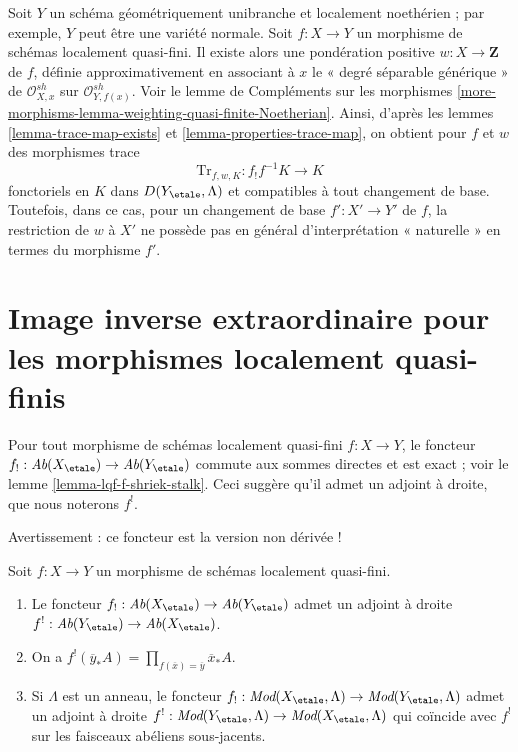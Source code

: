 \begin{example}
\label{example-trace-for-quasi-finite-over-normal}
Soit $Y$ un schéma géométriquement unibranche et localement noethérien ;
par exemple, $Y$ peut être une variété normale. Soit $f : X \to Y$ un morphisme de schémas
localement quasi-fini. Il existe alors une
pondération positive $w : X \to \mathbf{Z}$ de $f$,
définie approximativement en associant à $x$ le
« degré séparable générique »
de $\mathcal{O}_{X, x}^{sh}$ sur $\mathcal{O}_{Y, f(x)}^{sh}$.
Voir le lemme de Compléments sur les morphismes
\ref{more-morphisms-lemma-weighting-quasi-finite-Noetherian}.
Ainsi, d'après les lemmes \ref{lemma-trace-map-exists} et
\ref{lemma-properties-trace-map}, on obtient pour $f$ et $w$ des morphismes trace
$$
\text{Tr}_{f, w, K} : f_!f^{-1}K \longrightarrow K
$$
fonctoriels en $K$ dans $D(Y_\etale, \Lambda)$ et compatibles
à tout changement de base. Toutefois, dans ce cas, pour un changement de base
$f' : X' \to Y'$ de $f$, la restriction de $w$ à $X'$ ne possède pas en général
d'interprétation « naturelle » en termes du
morphisme $f'$.
\end{example}
















\section{Image inverse extraordinaire pour les morphismes localement quasi-finis}
\label{section-duality-locally-quasi-finite}

\noindent
Pour tout morphisme de schémas localement quasi-fini $f : X \to Y$, le
foncteur $f_! : \textit{Ab}(X_\etale) \to \textit{Ab}(Y_\etale)$ commute
aux sommes directes et est exact ; voir le lemme \ref{lemma-lqf-f-shriek-stalk}.
Ceci suggère qu'il admet un adjoint à droite, que nous noterons $f^!$.

\medskip\noindent
Avertissement : ce foncteur est la version non dérivée !

\begin{lemma}
\label{lemma-lqf-f-upper-shriek}
Soit $f : X \to Y$ un morphisme de schémas localement quasi-fini.
\begin{enumerate}
\item Le foncteur $f_! : \textit{Ab}(X_\etale) \to \textit{Ab}(Y_\etale)$
admet un adjoint à droite $f^! : \textit{Ab}(Y_\etale) \to \textit{Ab}(X_\etale)$.
\item On a
$f^!(\overline{y}_*A) = \prod_{f(\overline{x}) = \overline{y}} \overline{x}_*A$.
\item Si $\Lambda$ est un anneau, le foncteur
$f_! : \textit{Mod}(X_\etale, \Lambda) \to \textit{Mod}(Y_\etale, \Lambda)$
admet un adjoint à droite
$f^! : \textit{Mod}(Y_\etale, \Lambda) \to \textit{Mod}(X_\etale, \Lambda)$
qui coïncide avec $f^!$ sur les faisceaux abéliens sous-jacents.
\end{enumerate}
\end{lemma}

